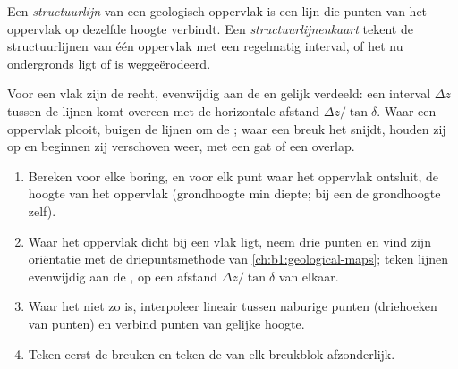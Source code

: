 \begin{definition}\label{def:b1:cross-sections:structure-contour}
Een \emph{structuurlijn} van een geologisch oppervlak is een lijn die punten van het
oppervlak op dezelfde hoogte verbindt. Een \emph{structuurlijnenkaart} tekent de
structuurlijnen van één oppervlak met een regelmatig interval, of het nu ondergronds ligt of is weggeërodeerd.
\end{definition}

Voor een vlak zijn de  recht, evenwijdig aan de  en gelijk verdeeld: een interval $\Delta z$
tussen de lijnen komt overeen met de horizontale afstand $\Delta z/\tan\delta$. Waar een oppervlak plooit, buigen de
lijnen om de ; waar een breuk het snijdt, houden zij op en beginnen zij verschoven weer, met een gat of een
overlap.

\begin{method}\label{met:b1:cross-sections:structure-contours}
\begin{enumerate}
  \item Bereken voor elke boring, en voor elk punt waar het oppervlak ontsluit, de hoogte van het oppervlak
        (grondhoogte min diepte; bij een  de grondhoogte zelf).
  \item Waar het oppervlak dicht bij een vlak ligt, neem drie punten en vind zijn oriëntatie met de
        driepuntsmethode van \cref{ch:b1:geological-maps}; teken lijnen evenwijdig aan de , op een
        afstand $\Delta z/\tan\delta$ van elkaar.
  \item Waar het niet zo is, interpoleer lineair tussen naburige punten (driehoeken van punten) en verbind
        punten van gelijke hoogte.
  \item Teken eerst de breuken en teken de  van elk breukblok afzonderlijk.
\end{enumerate}
\end{method}

